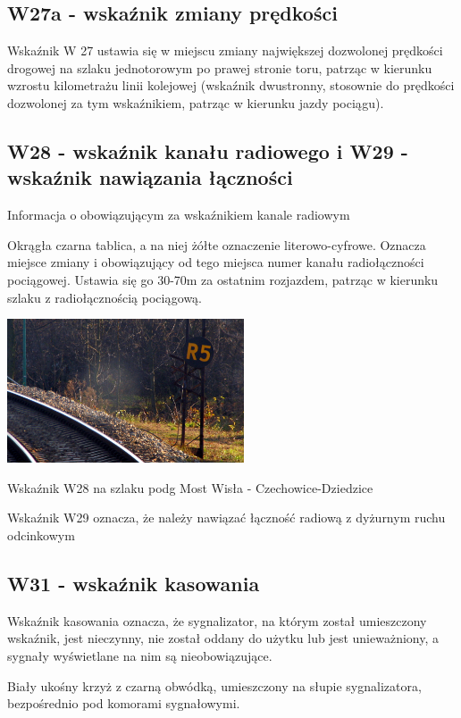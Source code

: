 \subsection{W27a - wskaźnik zmiany prędkości}

Wskaźnik W 27 ustawia się w miejscu zmiany największej dozwolonej prędkości drogowej na szlaku jednotorowym po prawej stronie toru, patrząc w kierunku wzrostu kilometrażu linii kolejowej (wskaźnik dwustronny, stosownie do prędkości dozwolonej za tym wskaźnikiem, patrząc w kierunku jazdy pociągu).

\subsection{W28 - wskaźnik kanału radiowego i W29 - wskaźnik nawiązania łączności}

\begin{tcolorbox}[colback=black!5!white,colframe=white!55!black,title=Wskaźnik W28]Informacja o obowiązującym za wskaźnikiem kanale radiowym
\end{tcolorbox}
Okrągła czarna tablica, a na niej żółte oznaczenie literowo-cyfrowe. Oznacza miejsce zmiany i obowiązujący od tego miejsca numer kanału radiołączności pociągowej. Ustawia się go 30-70m za ostatnim rozjazdem, patrząc w kierunku szlaku z radiołącznością pociągową.
	\begin{marginfigure}
		\includegraphics[width=7cm]{skryptkierownik-img/skryptkierownik-img019.jpg}
		\caption{Wskaźnik W28 na szlaku podg Most Wisła - Czechowice-Dziedzice}
		\label{fig:w28}
	\end{marginfigure}

Wskaźnik W29 oznacza, że należy nawiązać łączność radiową z dyżurnym ruchu odcinkowym

\subsection{W31 - wskaźnik kasowania}
\begin{tcolorbox}[colback=black!5!white,colframe=white!55!black,title=Wskaźnik W31]
{\textquotedbl}Wskaźnik kasowania{\textquotedbl} oznacza, że sygnalizator, na którym został umieszczony wskaźnik, jest nieczynny, nie został oddany do użytku lub jest unieważniony, a sygnały wyświetlane na nim są nieobowiązujące.
\end{tcolorbox}
Biały ukośny krzyż z czarną obwódką, umieszczony na słupie sygnalizatora, bezpośrednio pod komorami sygnałowymi.

